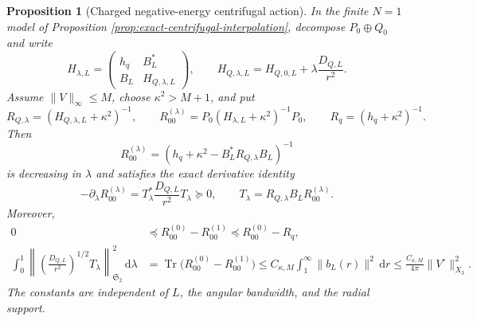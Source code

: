 \documentclass[11pt]{article}
\newcommand{\dd}{\,\mathrm d}
\newtheorem{proposition}[theorem]{Proposition}
\theoremstyle{definition}
\theoremstyle{remark}
\begin{document}
\begin{proposition}[Charged negative-energy centrifugal action]
\label{prop:negative-energy-centrifugal-action}
In the finite $N=1$ model of Proposition
\ref{prop:exact-centrifugal-interpolation}, decompose
$P_0\oplus Q_0$ and write
\begin{equation}
 H_{\lambda,L}=\begin{pmatrix}
  h_q&B_L^*\\ B_L&H_{Q,\lambda,L}
 \end{pmatrix},
 \qquad
 H_{Q,\lambda,L}=H_{Q,0,L}+\lambda\frac{D_{Q,L}}{r^2}.
 \label{eq:lambda-star-Feshbach-blocks}
\end{equation}
Assume $\|V\|_\infty\leq M$, choose $\kappa^2>M+1$, and put
\begin{equation}
 R_{Q,\lambda}=(H_{Q,\lambda,L}+\kappa^2)^{-1},
 \qquad
 R_{00}^{(\lambda)}
 =P_0(H_{\lambda,L}+\kappa^2)^{-1}P_0,
 \qquad
 R_q=(h_q+\kappa^2)^{-1}.
 \label{eq:lambda-compressed-negative-resolvents}
\end{equation}
Then
\begin{equation}
 R_{00}^{(\lambda)}
 =\left(h_q+\kappa^2-B_L^*R_{Q,\lambda}B_L\right)^{-1}
 \label{eq:lambda-Feshbach-negative-resolvent}
\end{equation}
is decreasing in $\lambda$ and satisfies the exact derivative identity
\begin{equation}
 -\partial_\lambda R_{00}^{(\lambda)}
 =T_\lambda^*\frac{D_{Q,L}}{r^2}T_\lambda\succeq0,
 \qquad
 T_\lambda=R_{Q,\lambda}B_LR_{00}^{(\lambda)}.
 \label{eq:negative-energy-centrifugal-action-density}
\end{equation}
Moreover,
\begin{align}
 0&\preceq R_{00}^{(0)}-R_{00}^{(1)}
 \preceq R_{00}^{(0)}-R_q,
 \label{eq:negative-energy-centrifugal-order}\\
 \int_0^1\left\|
   \left(\frac{D_{Q,L}}{r^2}\right)^{1/2}T_\lambda
  \right\|_{\mathfrak S_2}^2\dd\lambda
 &=\operatorname{Tr}\bigl(R_{00}^{(0)}-R_{00}^{(1)}\bigr)
 \leq C_{\kappa,M}\int_1^\infty\|b_L(r)\|^2\dd r
 \leq\frac{C_{\kappa,M}}{4\pi}\|V^\circ\|_{X_3}^2.
 \label{eq:charged-negative-energy-action-bound}
\end{align}
The constants are independent of $L$, the angular bandwidth, and the radial
support.
\end{proposition}
\end{document}
